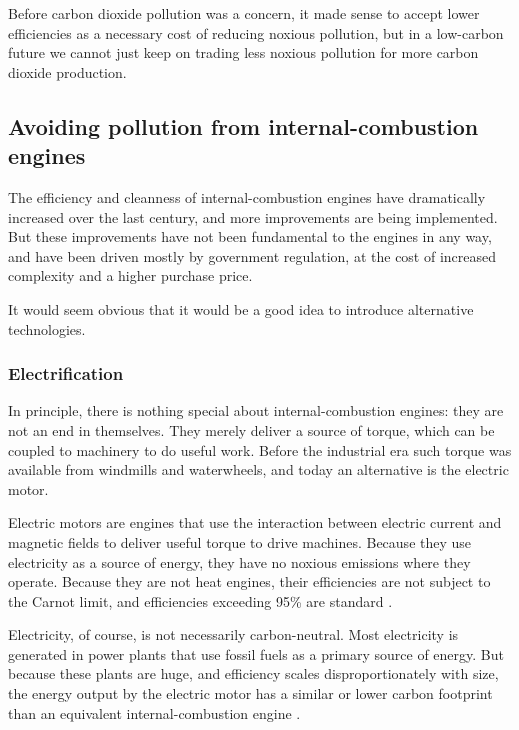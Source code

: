 Before carbon dioxide pollution was a concern, it made sense to accept lower
efficiencies as a necessary cost of reducing noxious pollution, but in a
low-carbon future we cannot just keep on trading less noxious pollution for more
carbon dioxide production.

\subsection{Avoiding pollution from internal\hyp{}combustion engines} \label{par:carbon-neutral}

The efficiency and cleanness of internal\hyp{}combustion engines have
dramatically increased over the last century, and more improvements are being
implemented. But these improvements have not been fundamental to the engines in
any way, and have been driven mostly by government regulation, at the cost of
increased complexity and a higher purchase price.

It would seem obvious that it would be a good idea to introduce alternative
technologies. 

\subsubsection{Electrification}

In principle, there is nothing special about internal\hyp{}combustion engines:
they are not an end in themselves. They mere\-ly deliver a source of torque,
which can be coupled to machinery to do useful work. Before the industrial era
such torque was available from windmills and waterwheels, and today an
alternative is the electric motor.

Electric motors are engines that use the interaction between electric current
and magnetic fields to deliver useful torque to drive machines. Because they use
electricity as a source of energy, they have no noxious emissions where they
operate. Because they are not heat engines, their efficiencies are not subject
to the Carnot limit, and efficiencies exceeding 95\% are standard \autocite{Li2012}.

Electricity, of course, is not necessarily carbon-neutral. Most electricity is
generated in power plants that use fossil fuels as a primary source of energy.
But because these plants are huge, and efficiency scales disproportionately with
size, the energy output by the electric motor has a similar or lower carbon
footprint than an equivalent internal\hyp{}combustion engine \autocite{Doucette2011}.

